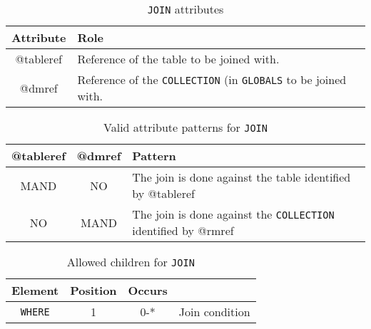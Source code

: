 \begin{lstlisting}[frame=single,caption={\texttt{JOIN} },style=XML,basicstyle=\tiny]

\end{lstlisting}


\begin{table}[!htbp]
\small
\centering
\begin{tabulary}{\linewidth}{|c|J|}       
       \hline 
            \textbf{Attribute} & 
            \textbf {Role}\\
       \hline         \hline  
             @tableref& 
            Reference of the table to be joined with. \\
        \hline 
            @dmref & 
            Reference of the \texttt{COLLECTION} (in \texttt{GLOBALS} to be joined with. \\
        \hline 
     \end{tabulary}
     \caption{\texttt{JOIN} attributes} 
     \label{tbl:join-att}
 \end{table}

\begin{table}[!htbp]
\small
\centering
\begin{tabulary}{\linewidth}{|c|c|J|}
    \hline 
        \textbf{@tableref} &
        \textbf{@dmref} &
        \textbf{Pattern}\\
    \hline      \hline  
        MAND &           
        NO &           
        The join is done against the table identified by @tableref \\
    \hline   
        NO &           
        MAND &           
        The join is done against the \texttt{COLLECTION} identified by @rmref \\
   \hline 
\end{tabulary}
     \caption{Valid attribute patterns for  \texttt{JOIN}}
     \label{tbl:join-pattern}
\end{table}


\begin{table}[!htbp]
\small
\centering
\begin{tabulary}{\linewidth}{|c |c |c|J|}
    \hline 
        \textbf{Element} &
        \textbf{Position} &
        \textbf{Occurs} &
        \\
    \hline      \hline  
        \texttt{WHERE}  &        
        1 &           
        0-* &
         Join condition\\
    \hline 
\end{tabulary}
     \caption{Allowed children for \texttt{JOIN}} 
     \label{tbl:join-chilren}
 \end{table}
